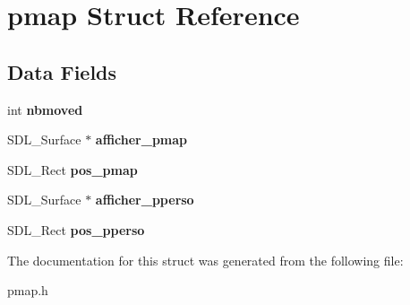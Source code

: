 \hypertarget{structpmap}{}\section{pmap Struct Reference}
\label{structpmap}
\subsection*{Data Fields}
\begin{DoxyCompactItemize}
\item 
\mbox{\label{structpmap_a70b813baa5dd1ba32e676491019f344c}} 
int {\bfseries nbmoved}
\item 
\mbox{\label{structpmap_a4fd1750570590001528322da168bbf8e}} 
S\+D\+L\+\_\+\+Surface $\ast$ {\bfseries afficher\+\_\+pmap}
\item 
\mbox{\label{structpmap_a1ec871d94c7648f3f1dc49e9cd3146d5}} 
S\+D\+L\+\_\+\+Rect {\bfseries pos\+\_\+pmap}
\item 
\mbox{\label{structpmap_a8c940484d97587e6c202433f7c2d5673}} 
S\+D\+L\+\_\+\+Surface $\ast$ {\bfseries afficher\+\_\+pperso}
\item 
\mbox{\label{structpmap_a6534b3c60d544631809c86d76450b592}} 
S\+D\+L\+\_\+\+Rect {\bfseries pos\+\_\+pperso}
\end{DoxyCompactItemize}


The documentation for this struct was generated from the following file\+:\begin{DoxyCompactItemize}
\item 
pmap.\+h\end{DoxyCompactItemize}
